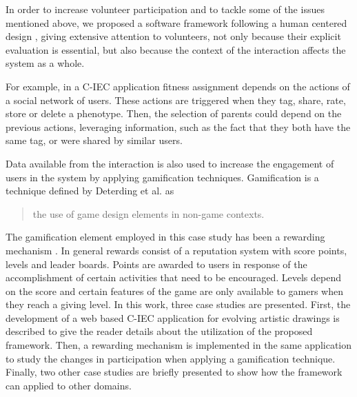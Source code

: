 In order to increase volunteer participation and to tackle some of the issues mentioned above,  
we proposed a software framework following a human centered design \cite{greenhouse2012human},
giving extensive attention to volunteers, not only because their
explicit evaluation is essential, but also because the context of the 
interaction affects the system as a whole.

For example, in a C-IEC application fitness assignment depends on the
actions of a social network of users.  These actions are triggered when 
they tag, share, rate, store or delete a phenotype. 
Then, the selection of parents could depend on the previous actions, leveraging information, 
such as the fact that they both have the same tag, or were shared by
similar users.

Data available from the interaction is also used to increase the engagement of 
users in the system by applying  gamification techniques. Gamification
is a technique defined by 
Deterding et al. \cite{deterding2011game} as
\begin{quote}
  the use of game design elements in non-game contexts.
\end{quote}  
The gamification element employed in this case study has been a rewarding mechanism  
\cite{dubois2013understanding}. In general rewards  consist of a reputation system 
with score points, levels and leader boards. Points are awarded to users in response of 
the accomplishment of certain activities that need to be encouraged. Levels depend
on the score and certain features of the game are only available to gamers when 
they reach a giving level. %
In this work, three case studies are presented. First, the development of a web based C-IEC application 
for evolving artistic drawings is described to give the reader details about 
the utilization of the proposed framework. Then, a rewarding mechanism is 
implemented in the same application to study the changes in participation
when applying a gamification technique. Finally, two other case studies are briefly presented
to show how the framework can applied to other domains. %

